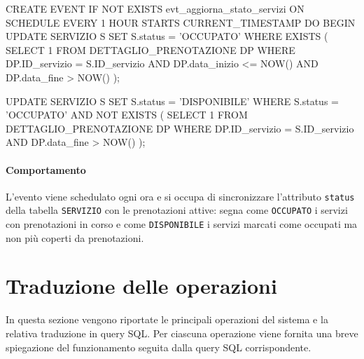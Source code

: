 \documentclass[a4paper,12pt]{report}
\begin{document}
\begin{sqlcode}[caption={},label={lst:event}]
	CREATE EVENT IF NOT EXISTS evt_aggiorna_stato_servizi
ON SCHEDULE EVERY 1 HOUR
STARTS CURRENT_TIMESTAMP
DO
BEGIN
UPDATE SERVIZIO S
SET S.status = 'OCCUPATO'
WHERE EXISTS (
	SELECT 1
	FROM DETTAGLIO_PRENOTAZIONE DP
	WHERE DP.ID_servizio = S.ID_servizio
	AND DP.data_inizio <= NOW()
	AND DP.data_fine > NOW()
	);

	UPDATE SERVIZIO S
	SET S.status = 'DISPONIBILE'
	WHERE S.status = 'OCCUPATO'
	AND NOT EXISTS (
	SELECT 1
	FROM DETTAGLIO_PRENOTAZIONE DP
	WHERE DP.ID_servizio = S.ID_servizio
	AND DP.data_fine > NOW()
);
\end{sqlcode}

\paragraph{Comportamento}
L'evento viene schedulato ogni ora e si occupa di sincronizzare l'attributo \texttt{status} della tabella \texttt{SERVIZIO} con le prenotazioni attive: segna come \texttt{OCCUPATO} i servizi con prenotazioni in corso e come \texttt{DISPONIBILE} i servizi marcati come occupati ma non più coperti da prenotazioni.

\section{Traduzione delle operazioni}

In questa sezione vengono riportate le principali operazioni del sistema
e la relativa traduzione in query SQL.
Per ciascuna operazione viene fornita una breve spiegazione del funzionamento seguita dalla query SQL corrispondente.
\end{document}
